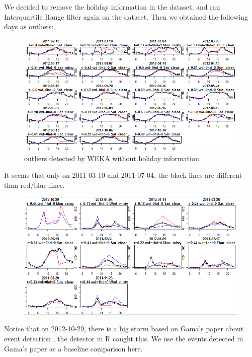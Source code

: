 \documentclass[12pt]{article}
\begin{document}
	We decided to remove the holiday information in the dataset, and ran Interquartile Range filter again on the dataset. Then we obtained the following days as outliers:
		\begin{figure}[H]
			\centering
			\includegraphics[scale=.65]{figures/outlier_weka_nonholliday.png}
			\caption{outliers detected by WEKA without holiday information}
		\end{figure}
	It seems that only on 2011-03-10 and 2011-07-04, the black lines are different than red/blue lines.
	\begin{figure}[H]
		\includegraphics[scale=0.7]{figures/outlier_R.png}
	\end{figure}
 Notice that  on 2012-10-29, there is a big storm based on Gama's paper about event detection \cite{dataset}, the detector in R caught this. We use the events detected in Gama's paper as a baseline comparison here. 
\end{document}

